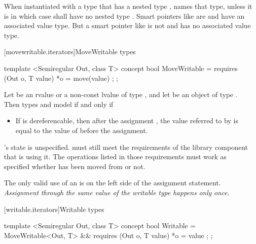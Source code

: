 \begin{addedblock}
\pnum
When instantiated with a type  that has a nested type ,
 names that type, unless it is  in which case
 shall have no nested type . \enternote Smart pointers like
 are  and have an associated value type. But a smart pointer
like  is not  and has no associated value type.\exitnote

[movewritable.iterators]{MoveWritable types}

\pnum
{}

%
\begin{codeblock}
  template <Semiregular Out, class T>
  concept bool MoveWritable =
    requires (Out o, T value) {
      { *o = move(value) };
    };
\end{codeblock}

\pnum
Let  be an rvalue or a non-const lvalue of type , and let  be an
object of type . Then types  and  model  if and
only if

\begin{itemize}
\item If  is dereferencable, then after the assignment , the value
referred to by  is equal to the value of  before the assignment.
\end{itemize}

\pnum
{}'s state is unspecified. \enternote {} must still meet the
requirements of the library component that is using it. The operations listed
in those requirements must work as specified whether  has been moved
from or not.\exitnote

\pnum
\enternote
The only valid use of an  is on the left side of the assignment statement.
\textit{Assignment through the same value of the writable type happens only once.}
\exitnote

[writable.iterators]{Writable types}

\pnum
{}

%
\begin{codeblock}
  template <Semiregular Out, class T>
  concept bool Writable =
    MoveWritable<Out, T> &&
    requires (Out o, T value) {
      { *o = value };
    };
\end{codeblock}


\end{addedblock}
